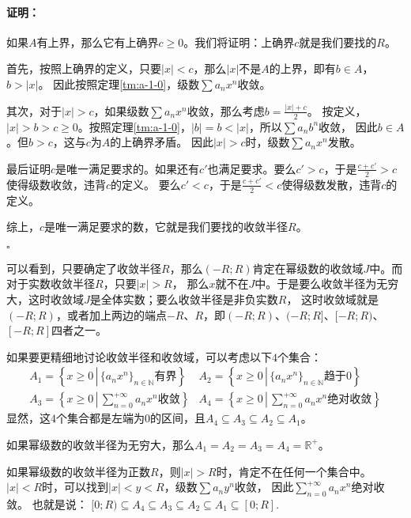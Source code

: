 \documentclass[12pt,UTF8]{ctexbook}
\theoremstyle{definition}
\theoremstyle{plain}
\renewenvironment{proof}{\paragraph{\textbf{证明：}}}{\hfill$\square$}
\begin{document}
\begin{appendix}
\begin{proof}
    如果$A$有上界，那么它有上确界$c\geqslant 0$。我们将证明：上确界$c$就是我们要找的$R$。
    
    首先，按照上确界的定义，只要$|x|<c$，那么$|x|$不是$A$的上界，即有$b\in A$，$b>|x|$。
    因此按照定理\ref{tm:a-1-0}，级数$\sum a_n x^n$收敛。

    其次，对于$|x|>c$，如果级数$\sum a_n x^n$收敛，那么考虑$b = \frac{|x| + c}{2}$。
    按定义，$|x| > b > c \geqslant 0$。按照定理\ref{tm:a-1-0}，$|b| = b < |x|$，所以$\sum a_n b^n$收敛，
    因此$b \in A$。但$b>c$，这与$c$为$A$的上确界矛盾。
    因此$|x|>c$时，级数$\sum a_n x^n$发散。

    最后证明$c$是唯一满足要求的。如果还有$c'$也满足要求。要么$c'>c$，于是$\frac{c+c'}{2} > c$使得级数收敛，违背$c$的定义。
    要么$c'<c$，于是$\frac{c+c'}{2} < c$使得级数发散，违背$c$的定义。

    综上，$c$是唯一满足要求的数，它就是我们要找的收敛半径$R$。

\end{proof}

可以看到，只要确定了收敛半径$R$，那么$(-R;R)$肯定在幂级数的收敛域$J$中。而对于实数收敛半径$R$，只要$|x|>R$，
那么$x$就不在$J$中。于是要么收敛半径为无穷大，这时收敛域$J$是全体实数；要么收敛半径是非负实数$R$，
这时收敛域就是$(-R;R)$，或者加上两边的端点$-R$、$R$，即$(-R;R)$、$(-R;R]$、$[-R;R)$、$[-R;R]$四者之一。

如果要更精细地讨论收敛半径和收敛域，可以考虑以下$4$个集合：
\begin{align*}
    A_1 = \left\{ x \geqslant 0 \, \left| \, \{a_n x^n\}_{n\in\mathbb{N}}\mbox{有界} \right. \right\} & A_2 = \left\{ x \geqslant 0 \, \left| \, \{a_n x^n\}_{n\in\mathbb{N}}\mbox{趋于}0 \right. \right\} \\[4pt]
    A_3 = \left\{ x \geqslant 0 \, \left| \, \sum_{n=0}^{+\infty} a_n x^n \mbox{收敛} \right. \right\} & A_4 =  \left\{ x \geqslant 0 \, \left| \, \sum_{n=0}^{+\infty} a_n x^n \mbox{绝对收敛} \right. \right\}
\end{align*}
显然，这$4$个集合都是左端为$0$的区间，且$A_4\subseteq A_3 \subseteq A_2\subseteq A_1$。

如果幂级数的收敛半径为无穷大，那么$A_1 = A_2 = A_3 = A_4 = \mathbb{R}^+$。

如果幂级数的收敛半径为正数$R$，则$|x|>R$时，肯定不在任何一个集合中。$|x|<R$时，可以找到$|x|<y<R$，级数$\sum a_n y^n$收敛，
因此$\sum_{n=0}^{+\infty} a_n x^n$绝对收敛。
也就是说：
$[0;R) \subseteq A_4\subseteq A_3 \subseteq A_2\subseteq A_1 \subseteq [0;R].$


\end{appendix}
\end{document}

